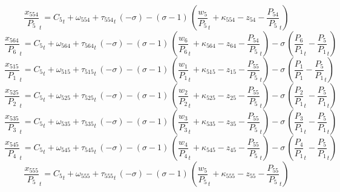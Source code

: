 \begin{dmath}
{{\frac{x_{554}}{P_{5}}}}_{t}={{C_{5}}}_{t}+{{\omega_{554}}}+{{\tau_{554}}}_{t}\, \left(-{{\sigma}}\right)-\left({{\sigma}}-1\right)\, \left({{\frac{w_{5}}{P_{5}}}}_{t}+{{\kappa_{554}}}-{{z_{54}}}-{{\frac{P_{54}}{P_{5}}}}_{t}\right)
\end{dmath}
\begin{dmath}
{{\frac{x_{564}}{P_{6}}}}_{t}={{C_{5}}}_{t}+{{\omega_{564}}}+{{\tau_{564}}}_{t}\, \left(-{{\sigma}}\right)-\left({{\sigma}}-1\right)\, \left({{\frac{w_{6}}{P_{6}}}}_{t}+{{\kappa_{564}}}-{{z_{64}}}-{{\frac{P_{54}}{P_{5}}}}_{t}\right)-{{\sigma}}\, \left({{\frac{P_{6}}{P_{1}}}}_{t}-{{\frac{P_{5}}{P_{1}}}}_{t}\right)
\end{dmath}
\begin{dmath}
{{\frac{x_{515}}{P_{1}}}}_{t}={{C_{5}}}_{t}+{{\omega_{515}}}+{{\tau_{515}}}_{t}\, \left(-{{\sigma}}\right)-\left({{\sigma}}-1\right)\, \left({{\frac{w_{1}}{P_{1}}}}_{t}+{{\kappa_{515}}}-{{z_{15}}}-{{\frac{P_{55}}{P_{5}}}}_{t}\right)-{{\sigma}}\, \left({{\frac{P_{1}}{P_{1}}}}-{{\frac{P_{5}}{P_{1}}}}_{t}\right)
\end{dmath}
\begin{dmath}
{{\frac{x_{525}}{P_{2}}}}_{t}={{C_{5}}}_{t}+{{\omega_{525}}}+{{\tau_{525}}}_{t}\, \left(-{{\sigma}}\right)-\left({{\sigma}}-1\right)\, \left({{\frac{w_{2}}{P_{2}}}}_{t}+{{\kappa_{525}}}-{{z_{25}}}-{{\frac{P_{55}}{P_{5}}}}_{t}\right)-{{\sigma}}\, \left({{\frac{P_{2}}{P_{1}}}}_{t}-{{\frac{P_{5}}{P_{1}}}}_{t}\right)
\end{dmath}
\begin{dmath}
{{\frac{x_{535}}{P_{3}}}}_{t}={{C_{5}}}_{t}+{{\omega_{535}}}+{{\tau_{535}}}_{t}\, \left(-{{\sigma}}\right)-\left({{\sigma}}-1\right)\, \left({{\frac{w_{3}}{P_{3}}}}_{t}+{{\kappa_{535}}}-{{z_{35}}}-{{\frac{P_{55}}{P_{5}}}}_{t}\right)-{{\sigma}}\, \left({{\frac{P_{3}}{P_{1}}}}_{t}-{{\frac{P_{5}}{P_{1}}}}_{t}\right)
\end{dmath}
\begin{dmath}
{{\frac{x_{545}}{P_{4}}}}_{t}={{C_{5}}}_{t}+{{\omega_{545}}}+{{\tau_{545}}}_{t}\, \left(-{{\sigma}}\right)-\left({{\sigma}}-1\right)\, \left({{\frac{w_{4}}{P_{4}}}}_{t}+{{\kappa_{545}}}-{{z_{45}}}-{{\frac{P_{55}}{P_{5}}}}_{t}\right)-{{\sigma}}\, \left({{\frac{P_{4}}{P_{1}}}}_{t}-{{\frac{P_{5}}{P_{1}}}}_{t}\right)
\end{dmath}
\begin{dmath}
{{\frac{x_{555}}{P_{5}}}}_{t}={{C_{5}}}_{t}+{{\omega_{555}}}+{{\tau_{555}}}_{t}\, \left(-{{\sigma}}\right)-\left({{\sigma}}-1\right)\, \left({{\frac{w_{5}}{P_{5}}}}_{t}+{{\kappa_{555}}}-{{z_{55}}}-{{\frac{P_{55}}{P_{5}}}}_{t}\right)
\end{dmath}
